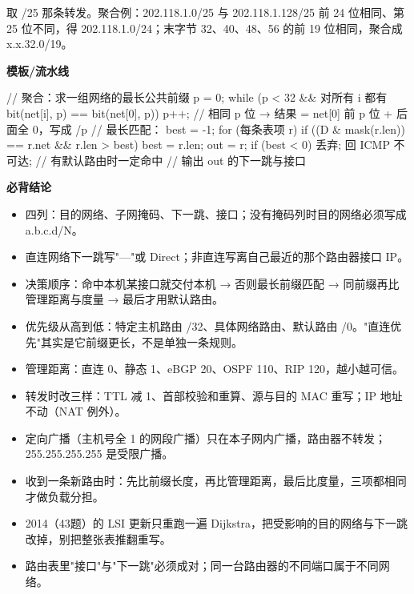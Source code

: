 \documentclass[10pt,a4paper]{ctexart}
\begin{document}
取 /25 那条转发。聚合例：202.118.1.0/25 与 202.118.1.128/25 前 24 位相同、第 25 位不同，得 202.118.1.0/24；末字节 32、40、48、56 的前 19 位相同，聚合成 x.x.32.0/19。

\textbf{模板/流水线}

\begin{codebox}
// 聚合：求一组网络的最长公共前缀
p = 0;
while (p < 32 && 对所有 i 都有 bit(net[i], p) == bit(net[0], p)) p++;
// 相同 p 位 → 结果 = net[0] 前 p 位 + 后面全 0，写成 /p
// 最长匹配：
best = -1;
for (每条表项 r)
    if ((D & mask(r.len)) == r.net && r.len > best) { best = r.len; out = r; }
if (best < 0) { 丢弃; 回 ICMP 不可达; }     // 有默认路由时一定命中
// 输出 out 的下一跳与接口
\end{codebox}




\textbf{必背结论}

\begin{itemize}

\item 四列：目的网络、子网掩码、下一跳、接口；没有掩码列时目的网络必须写成 a.b.c.d/N。

\item 直连网络下一跳写"—"或 Direct；非直连写离自己最近的那个路由器接口 IP。

\item 决策顺序：命中本机某接口就交付本机 → 否则最长前缀匹配 → 同前缀再比管理距离与度量 → 最后才用默认路由。

\item 优先级从高到低：特定主机路由 /32、具体网络路由、默认路由 /0。"直连优先"其实是它前缀更长，不是单独一条规则。

\item 管理距离：直连 0、静态 1、eBGP 20、OSPF 110、RIP 120，越小越可信。

\item 转发时改三样：TTL 减 1、首部校验和重算、源与目的 MAC 重写；IP 地址不动（NAT 例外）。

\item 定向广播（主机号全 1 的网段广播）只在本子网内广播，路由器不转发；255.255.255.255 是受限广播。

\item 收到一条新路由时：先比前缀长度，再比管理距离，最后比度量，三项都相同才做负载分担。

\item 2014（43题）的 LSI 更新只重跑一遍 Dijkstra，把受影响的目的网络与下一跳改掉，别把整张表推翻重写。

\item 路由表里"接口"与"下一跳"必须成对；同一台路由器的不同端口属于不同网络。

\end{itemize}
\end{document}
